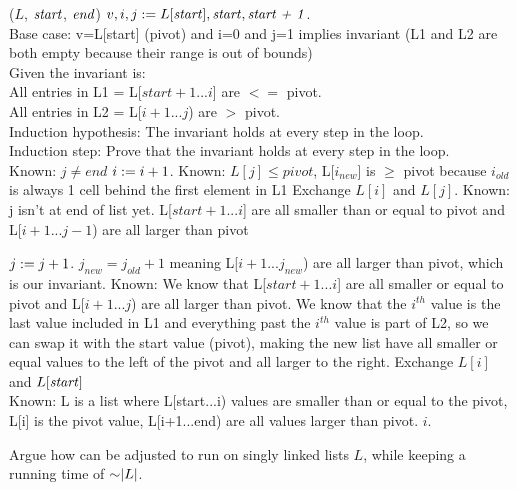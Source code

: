 \begin{problem}
\begin{questions}
\begin{myalgo}{($L$, $\textit{start\/}$, $\textit{end\/}$)}
    \STATE $v, i, j := L[\textit{start\/}], \textit{start\/}, \textit{start + 1\/}$.\\
    Base case: v=L[start] (pivot) and i=0 and j=1 implies invariant (L1 and L2 are both empty because their range is out of bounds) \\
    Given the invariant is: \\
    All entries in L1 = L[$start+1$...$i$] are $<=$ pivot.\\
    All entries in L2 = L[$i + 1$...$j$) are $>$ pivot.\\
    Induction hypothesis: The invariant holds at every step in the loop.\\
    Induction step: Prove that the invariant holds at every step in the loop.\\
    \label{alg:while}
    \STATE Known: $j \neq end$
            \STATE $i := i + 1$.
            \STATE Known: $L[j] \leq pivot$, L[$i_{new}$] is $\geq$ pivot because $i_{old}$ is always 1 cell behind the first element in L1
            \STATE Exchange $L[i]$ and $L[j]$.
            \STATE Known: j isn't at end of list yet. L[$start+1$...$i$] are all smaller than or equal to pivot and L[$i + 1$...$j-1$) are all larger than pivot 
    
        \ENDIF
        \STATE $j := j + 1$.
        \STATE $j_{new} = j_{old} + 1$ meaning L[$i + 1$...$j_{new}$) are all larger than pivot, which is our invariant.
    \ENDWHILE
    \STATE Known: We know that L[$start+1$...$i$] are all smaller or equal to pivot and L[$i + 1$...$j$) are all larger than pivot. We know that the $i^{th}$ value is the last value included in L1 and everything past the $i^{th}$ value is part of L2, so we can swap it with the start value (pivot), making the new list have all smaller or equal values to the left of the pivot and all larger to the right.
    \STATE Exchange $L[i]$ and $L[\textit{start\/}]$
    \\Known: L is a list where L[start...i) values are smaller than or equal to the pivot, L[i] is the pivot value, L[i+1...end) are all values larger than pivot.
    \RETURN $i$.
\end{myalgo}

    \item Argue how  can be adjusted to run on singly linked lists $L$, while keeping a running time of $\mathord{\sim}\lvert L \rvert$.\\


\end{questions}
\end{problem}
